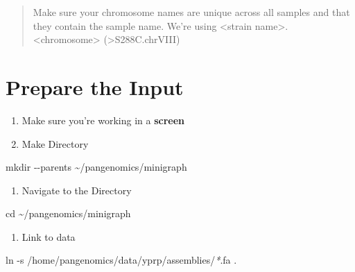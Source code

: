 \documentclass[
]{book}
\newenvironment{Shaded}{\begin{snugshade}}{\end{snugshade}}
\newcommand{\AttributeTok}[1]{\textcolor[rgb]{0.77,0.63,0.00}{#1}}
\newcommand{\BuiltInTok}[1]{#1}
\newcommand{\FunctionTok}[1]{\textcolor[rgb]{0.00,0.00,0.00}{#1}}
\newcommand{\NormalTok}[1]{#1}
\newcommand{\PreprocessorTok}[1]{\textcolor[rgb]{0.56,0.35,0.01}{\textit{#1}}}
\providecommand{\tightlist}{%
  \setlength{\itemsep}{0pt}\setlength{\parskip}{0pt}}
\begin{document}
\begin{quote}
Make sure your chromosome names are unique across all samples and that they contain the sample name. We're using \textless strain name\textgreater.\textless chromosome\textgreater{} (\textgreater S288C.chrVIII)
\end{quote}

\hypertarget{prepare-the-input}{%
\section{Prepare the Input}\label{prepare-the-input}}

\begin{enumerate}
\def\labelenumi{\arabic{enumi}.}
\item
  Make sure you're working in a \textbf{screen}
\item
  Make Directory
\end{enumerate}

\begin{Shaded}
\begin{Highlighting}[]
\FunctionTok{mkdir} \AttributeTok{{-}{-}parents}\NormalTok{ \textasciitilde{}/pangenomics/minigraph}
\end{Highlighting}
\end{Shaded}

\begin{enumerate}
\def\labelenumi{\arabic{enumi}.}
\setcounter{enumi}{2}
\tightlist
\item
  Navigate to the Directory
\end{enumerate}

\begin{Shaded}
\begin{Highlighting}[]
\BuiltInTok{cd}\NormalTok{ \textasciitilde{}/pangenomics/minigraph}
\end{Highlighting}
\end{Shaded}

\begin{enumerate}
\def\labelenumi{\arabic{enumi}.}
\setcounter{enumi}{3}
\tightlist
\item
  Link to data
\end{enumerate}

\begin{Shaded}
\begin{Highlighting}[]
\FunctionTok{ln} \AttributeTok{{-}s}\NormalTok{ /home/pangenomics/data/yprp/assemblies/}\PreprocessorTok{*}\NormalTok{.fa .}
\end{Highlighting}
\end{Shaded}
\end{document}
